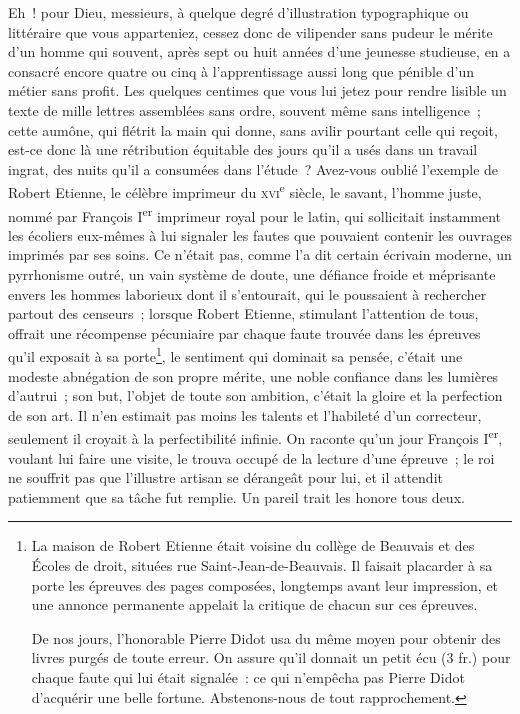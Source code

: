 \documentclass[french,twoside]{book} %
\begin{document}
Eh ! pour Dieu, messieurs, à quelque degré d’illustration typographique ou littéraire que vous apparteniez, cessez donc de vilipender sans pudeur le mérite d’un homme qui souvent, après sept ou huit années d’une jeunesse studieuse, en a consacré encore quatre ou cinq à l’apprentissage aussi long que pénible d’un métier sans profit. Les quelques centimes que vous lui jetez pour rendre  lisible un texte de mille lettres assemblées sans ordre, souvent même sans intelligence ; cette aumône, qui flétrit la main qui donne, sans avilir pourtant celle qui reçoit, est-ce donc là une rétribution équitable des jours qu’il a usés dans un travail ingrat, des nuits qu’il a consumées dans l’étude ? Avez-vous oublié l’exemple de Robert Etienne, le célèbre imprimeur du {\scshape xvi}\textsuperscript{e} siècle, le savant, l’homme juste, nommé par François I\textsuperscript{er} imprimeur royal pour le latin, qui sollicitait instamment les écoliers eux-mêmes à lui signaler les fautes que pouvaient contenir les ouvrages imprimés par ses soins. Ce n’était pas, comme l’a dit certain écrivain moderne, un pyrrhonisme outré, un vain système de doute, une défiance froide et méprisante envers les hommes laborieux dont il s’entourait, qui le poussaient à rechercher partout des censeurs ; lorsque Robert Etienne, stimulant l’attention de tous, offrait une récompense pécuniaire  par chaque faute trouvée dans les épreuves qu’il exposait à sa porte\footnote{ \noindent La maison de Robert Etienne était voisine du collège de Beauvais et des Écoles de droit, situées rue Saint-Jean-de-Beauvais. Il faisait placarder à sa porte les épreuves des pages composées, longtemps avant leur impression, et une annonce permanente appelait la critique de chacun sur ces épreuves.\par
 De nos jours, l’honorable Pierre Didot usa du même moyen pour obtenir des livres purgés de toute erreur. On assure qu’il donnait un petit écu (3 fr.) pour chaque faute qui lui était signalée : ce qui n’empêcha pas Pierre Didot d’acquérir une belle fortune. Abstenons-nous de tout rapprochement.
 }, le sentiment qui dominait sa pensée, c’était une modeste abnégation de son propre mérite, une noble confiance dans les lumières d’autrui ; son but, l’objet de toute son ambition, c’était la gloire et la perfection de son art. Il n’en estimait pas moins les talents et l’habileté d’un correcteur, seulement il croyait à la perfectibilité infinie. On raconte qu’un jour François I\textsuperscript{er}, voulant lui faire une visite, le trouva  occupé de la lecture d’une épreuve ; le roi ne souffrit pas que l’illustre artisan se dérangeât pour lui, et il attendit patiemment que sa tâche fut remplie. Un pareil trait les honore tous deux.\par
\end{document}
